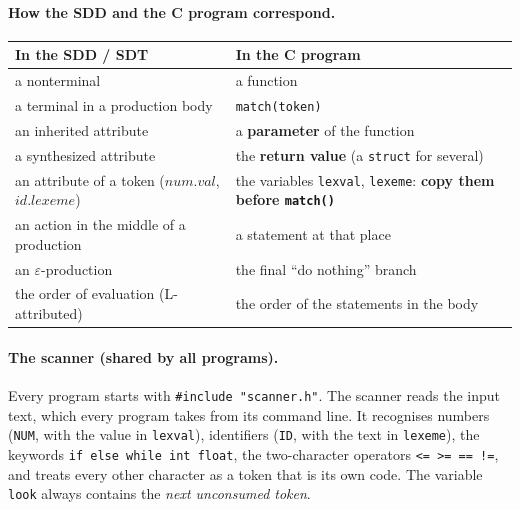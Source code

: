 \documentclass[11pt,a4paper]{article}
\begin{document}
\paragraph{How the SDD and the C program correspond.}
\begin{center}
\small
\begin{tabular}{@{}l l@{}}
\toprule
\textbf{In the SDD / SDT} & \textbf{In the C program} \\ \midrule
a nonterminal & a function \\
a terminal in a production body & \texttt{match(token)} \\
an inherited attribute & a \textbf{parameter} of the function \\
a synthesized attribute & the \textbf{return value} (a \texttt{struct} for several) \\
an attribute of a token ($\mathit{num}.\mathit{val}$, $\mathit{id}.\mathit{lexeme}$) & the variables \texttt{lexval}, \texttt{lexeme}: \textbf{copy them before \texttt{match()}} \\
an action in the middle of a production & a statement at that place \\
an $\varepsilon$-production & the final ``do nothing'' branch \\
the order of evaluation (L-attributed) & the order of the statements in the body \\ \bottomrule
\end{tabular}
\end{center}

\paragraph{The scanner (shared by all programs).} Every program starts with \texttt{\#include "scanner.h"}. The scanner reads the input text, which every program takes from its command line. It recognises numbers (\texttt{NUM}, with the value in \texttt{lexval}), identifiers (\texttt{ID}, with the text in \texttt{lexeme}), the keywords \texttt{if else while int float}, the two-character operators \texttt{<= >= == !=}, and treats every other character as a token that is its own code. The variable \texttt{look} always contains the \emph{next unconsumed token}.
\end{document}
